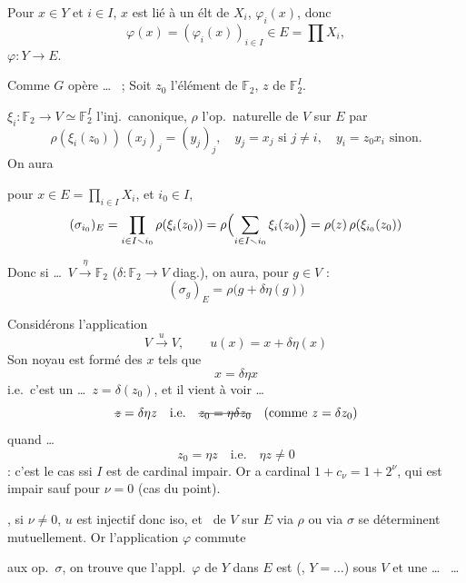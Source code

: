 \documentclass[11pt,a4paper]{article}
\begin{document}
Pour $x \in Y$ et $i \in I$, $x$ est lié à un élt  de $X_i$,  $\varphi_i(x)$, donc
\[
\varphi(x) = (\varphi_i(x))_{i\in I} \in E = \prod X_i ,
\]
 $\varphi : Y \to E$.

Comme $G$ opère \ldots\ \ill{} ; \struck{\ill{}} Soit $z_0$ l'élément  de $\mathbb{F}_2$, $z$  de $\mathbb{F}_2^I$.


$\xi_i : \mathbb{F}_2 \to V \simeq \mathbb{F}_2^I$ l'inj.\ canonique, $\rho$ l'op.\ naturelle de $V$ sur $E$ par
\[
\rho(\xi_i(z_0))\,(x_j)_j = (y_j)_j , \quad y_j = x_j \text{ si } j \neq i, \quad y_i = z_0 x_i \text{ sinon}.
\]
On aura 

pour $x \in E = \prod_{i\in I} X_i$, et  $i_0 \in I$,
\[
(\sigma_{i_0})_E = \prod_{i \in I \smallsetminus i_0} \rho(\xi_i(z_0)) = \rho\Bigl(\sum_{i\in I\smallsetminus i_0} \xi_i(z_0)\Bigr) = \rho(z)\,\rho(\xi_{i_0}(z_0))
\]

Donc si \ldots\ $V \xrightarrow{\ \eta\ } \mathbb{F}_2$  ($\delta : \mathbb{F}_2 \to V$ diag.), on aura, pour $g \in V$ :
\[
(\sigma_g)_E = \rho\bigl(g + \delta\eta(g)\bigr)
\]

Considérons l'application
\[
V \xrightarrow{\ u\ } V, \qquad u(x) = x + \delta\eta(x)
\]
Son noyau est formé des $x$ tels que
\[
x = \delta\eta x
\]
\struck{\ill{}} i.e.\ c'est un  \ldots\ $z = \delta(z_0)$, et il vient à voir \ldots
\[
\text{\struck{$z$}} = \delta\eta z \quad \text{i.e.} \quad \text{\struck{$z_0 = \eta\delta z_0$}} \quad (\text{comme } z = \delta z_0)
\]
quand \ldots
\[
z_0 = \eta z \quad \text{i.e.} \quad \eta z \neq 0
\]
: c'est le cas ssi $I$ est de cardinal impair. Or a cardinal $1 + c_\nu = 1 + 2^\nu$, qui est impair sauf pour $\nu = 0$ (cas du point). 

, si $\nu \neq 0$, $u$ est injectif donc iso, et \struck{\ill{}} \ de $V$ sur $E$ via $\rho$ ou via $\sigma$ se déterminent mutuellement. Or l'application $\varphi$ commute

aux op.\ $\sigma$, on trouve que l'appl.\ $\varphi$ de $Y$ dans $E$ est \struck{\ldots} (,  $Y = \ldots$) sous $V$ et une \ldots\  \ldots
\end{document}
